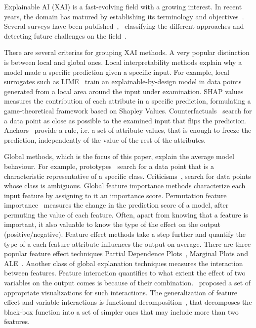 Explainable AI (XAI) is a fast-evolving field with a growing
interest. In recent years, the domain has matured by establishing its
terminology and objectives~\citep{Hoffman2018}. Several surveys have
been published~\citep{BarredoArrieta2020},~\citep{Adadi2018} classifying
the different approaches and detecting future challenges on the
field~\citep{Molnar2020}.

There are several criterias for grouping XAI methods. A very popular
distinction is between local and global ones. Local interpretability
methods explain why a model made a specific prediction given a
specific input. For example, local surrogates such as
LIME~\citep{Ribeiro2016} train an explainable-by-design model in data
points generated from a local area around the input under
examination. SHAP values~\citep{Lundberg2017} measures the contribution
of each attribute in a specific prediction, formulating a
game-theoretical framework based on Shapley
Values. Counterfactuals~\citep{Wachter2017} search for a data point as
close as possible to the examined input that flips the
prediction. Anchors~\citep{Ribeiro2018} provide a rule, i.e. a set of
attribute values, that is enough to freeze the prediction,
independently of the value of the rest of the attributes.


Global methods, which is the focus of this paper, explain the average
model behaviour. For example, prototypes~\citep{Gurumoorthy2019} search
for a data point that is a characteristic representative of a specific
class. Criticisms~\citep{Kim2016}, search for data points whose class
is ambiguous. Global feature importance methods characterize each
input feature by assigning to it an importance score. Permutation
feature importance~\citep{Fisher2019} measures the change in the
prediction score of a model, after permuting the value of each
feature. Often, apart from knowing that a feature is important, it
also valuable to know the type of the effect on the output
(positive/negative). Feature effect methods take a step further and
quantify the type of a each feature attribute influences the output on
average. There are three popular feature effect techniques Partial
Dependence Plots~\citep{Friedman2001}, Marginal Plots and
ALE~\citep{Apley2020}. Another class of global explanation techniques
measures the interaction~\citep{Friedman2008} between features. Feature
interaction quantifies to what extent the effect of two variables on
the output comes is because of their combination.~\cite{Friedman2008}
proposed a set of appropriate visualizations for such
interactions. The generalization of feature effect and variable
interactions is functional decomposition~\citep{Molnar2021}, that
decomposes the black-box function into a set of simpler ones that may
include more than two features.
